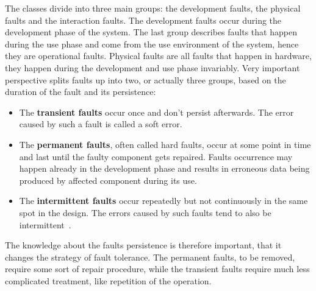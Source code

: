 The classes divide into three main groups: the development faults, the physical faults and the interaction faults. The development faults occur during the development phase of the system. The last group describes faults that happen during the use phase and come from the use environment of the system, hence they are operational faults. Physical faults are all faults that happen in hardware, they happen during the development and use phase invariably.
Very important perspective splits faults up into two, or actually three groups, based on the duration of the fault and its persistence:
\begin{itemize}
    \item The \textbf{transient faults} occur once and don't persist afterwards. The error caused by such a fault is called a soft error.
    \item The \textbf{permanent faults}, often called hard faults, occur at some point in time and last until the faulty component gets repaired. Faults occurrence may happen already in the development phase and results in erroneous data being produced by affected component during its use. 
    \item The \textbf{intermittent faults} occur repeatedly but not continuously in the same spot in the design. The errors caused by such faults tend to also be intermittent~\cite{book:Sorin}.
\end{itemize}
The knowledge about the faults persistence is therefore important, that it changes the strategy of fault tolerance. The permanent faults, to be removed, require some sort of repair procedure, while the transient faults require much less complicated treatment, like repetition of the operation.

